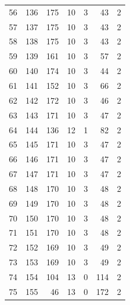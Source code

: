 \documentclass[a4paper,twoside,12pt]{book}
\begin{document}
\begin{appendices}
\begin{table}
\begin{tabular}{lrrrrrr}
		56  &    136 &       175 &        10 &               3 &              43 &         2 \\
		57  &    137 &       175 &        10 &               3 &              43 &         2 \\
		58  &    138 &       175 &        10 &               3 &              43 &         2 \\
		59  &    139 &       161 &        10 &               3 &              57 &         2 \\
		60  &    140 &       174 &        10 &               3 &              44 &         2 \\
		61  &    141 &       152 &        10 &               3 &              66 &         2 \\
		62  &    142 &       172 &        10 &               3 &              46 &         2 \\
		63  &    143 &       171 &        10 &               3 &              47 &         2 \\
		64  &    144 &       136 &        12 &               1 &              82 &         2 \\
		65  &    145 &       171 &        10 &               3 &              47 &         2 \\
		66  &    146 &       171 &        10 &               3 &              47 &         2 \\
		67  &    147 &       171 &        10 &               3 &              47 &         2 \\
		68  &    148 &       170 &        10 &               3 &              48 &         2 \\
		69  &    149 &       170 &        10 &               3 &              48 &         2 \\
		70  &    150 &       170 &        10 &               3 &              48 &         2 \\
		71  &    151 &       170 &        10 &               3 &              48 &         2 \\
		72  &    152 &       169 &        10 &               3 &              49 &         2 \\
		73  &    153 &       169 &        10 &               3 &              49 &         2 \\
		74  &    154 &       104 &        13 &               0 &             114 &         2 \\
		75  &    155 &        46 &        13 &               0 &             172 &         2 \\

\end{tabular}
\end{table}
\end{appendices}
\end{document}
